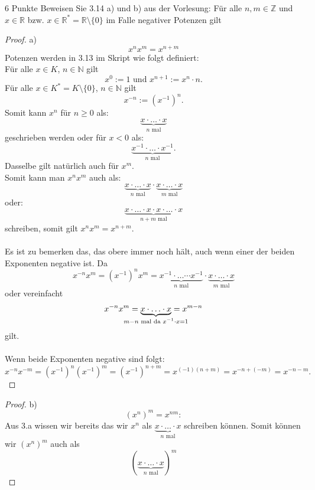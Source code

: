 \documentclass{../problemset}
\begin{document}
\begin{problem}{6 Punkte}
Beweisen Sie 3.14 a) und b) aus der Vorlesung:
\newline\newline
Für alle $n,m \in \mathbb{Z}$ und $x \in \mathbb{R}$ bzw. $x \in \mathbb{R}^* = \mathbb{R}\setminus\{0\}$ im Falle negativer Potenzen gilt
\begin{proof}
	a)
	\begin{displaymath}
		x^nx^m = x^{n+m}
	\end{displaymath}
	Potenzen werden in 3.13 im Skript wie folgt definiert: \\
	Für alle $x \in K$, $n \in \mathbb{N}$ gilt
	\[
		x^0 := 1 \text{ und } x^{n+1}:=x^n \cdot n.
	\]
	Für alle $x \in K^*=K\setminus\{0\}$, $n \in \mathbb{N}$ gilt \[
		x^{-n} := (x^{-1})^n.
	\]
	Somit kann $x^n$ für $n \ge 0$ als: \[
		\underbrace{x \cdot \ldots \cdot x}_{n\text{ mal}}
	\] geschrieben werden oder für $x < 0$ als: \[
		\underbrace{x^{-1} \cdot \ldots \cdot x^{-1}}_{n\text{ mal}}.
	\]
	Dasselbe gilt natürlich auch für $x^m$. \\
	Somit kann man $x^nx^m$ auch als: \[
		\underbrace{x \cdot \ldots \cdot x}_{n\text{ mal}} \cdot \underbrace{x \cdot \ldots \cdot x}_{m\text{ mal}}
	\] oder: \[
		\underbrace{x \cdot \ldots \cdot x \cdot x \cdot \ldots \cdot x}_{n+m\text{ mal}}
	\] schreiben, somit gilt $x^nx^m = x^{n+m}$. \\
	\\
	Es ist zu bemerken das, das obere immer noch hält, auch wenn einer der beiden Exponenten negative ist.
	Da \[
		x^{-n}x^m = {(x^{-1})}^nx^m = \underbrace{x^{-1} \cdot\ldots\cdots x^{-1}}_{n\text{ mal}} \cdot \underbrace{x \cdot \ldots \cdot x}_{m\text{ mal}}
	\] oder vereinfacht \[
		x^{-n}x^m = \underbrace{x \cdot \ldots \cdot x}_{\mathclap{m - n\text{ mal da } x^{-1} \cdot x = 1}} = x^{m-n}
	\] gilt. \\
	\\
	Wenn beide Exponenten negative sind folgt: \[
		x^{-n}x^{-m} = {(x^{-1})}^n{(x^{-1})}^m = {(x^{-1})}^{n+m} = x^{(-1)(n+m)} = x^{-n+(-m)} = x^{-n-m}.
	\]
\end{proof}
\begin{proof}
	b)
	\begin{displaymath}
		{(x^n)}^m = x^{nm}:
	\end{displaymath}
	Aus 3.a wissen wir bereits das wir $x^n$ als $\underbrace{x \cdot \ldots \cdot x}_{n\text{ mal}}$ schreiben können.
	Somit können wir ${(x^n)}^m$ auch als \[
		(\underbrace{x \cdot \ldots \cdot x}_{n\text{ mal}})^m
\]
\end{proof}
\end{problem}
\end{document}
